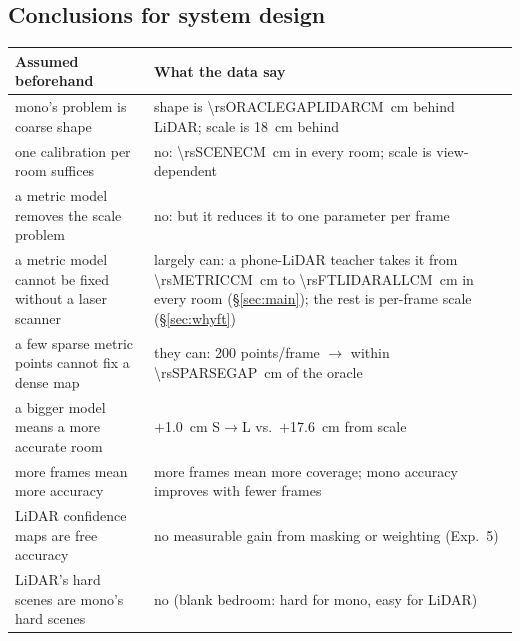 \subsection{Conclusions for system design}
\begin{table}[t]
\centering\small
\begin{tabularx}{\textwidth}{@{}XX@{}}
\toprule
Assumed beforehand & What the data say \\
\midrule
mono's problem is coarse shape & shape is \SI{\rsORACLEGAPLIDARCM}{cm} behind LiDAR; scale is \SI{18}{cm} behind \\
one calibration per room suffices & no: \SI{\rsSCENECM}{cm} in every room; scale is view-dependent \\
a metric model removes the scale problem & no: but it reduces it to one parameter per frame \\
a metric model cannot be fixed without a laser scanner & largely can: a phone-LiDAR teacher takes it from \SI{\rsMETRICCM}{cm} to \SI{\rsFTLIDARALLCM}{cm} in every room (\S\ref{sec:main}); the rest is per-frame scale (\S\ref{sec:whyft}) \\
a few sparse metric points cannot fix a dense map & they can: 200 points/frame $\rightarrow$ within \SI{\rsSPARSEGAP}{cm} of the oracle \\
a bigger model means a more accurate room & $+$\SI{1.0}{cm} S$\rightarrow$L vs.\ $+$\SI{17.6}{cm} from scale \\
more frames mean more accuracy & more frames mean more coverage; mono accuracy improves with fewer frames \\
LiDAR confidence maps are free accuracy & no measurable gain from masking or weighting (Exp.~5) \\
LiDAR's hard scenes are mono's hard scenes & no (blank bedroom: hard for mono, easy for LiDAR) \\
\bottomrule
\end{tabularx}
\end{table}
